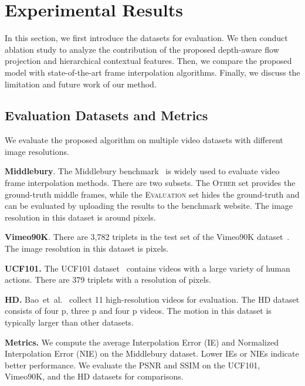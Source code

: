 \documentclass[10pt,twocolumn,letterpaper]{article}
\newcommand{\Paragraph}[1]{{\vspace{-2mm}\flushleft\textbf{#1}}} \newcommand{\ul}[1]{\underline{\smash{#1}}}
\def\etal{et~al.\xspace}
\begin{document}
	
	\section{Experimental Results}
In this section, we first introduce the datasets for evaluation.
We then conduct ablation study to analyze the contribution of the proposed depth-aware flow projection and hierarchical contextual features.
Then, we compare the proposed model with state-of-the-art frame interpolation algorithms.
Finally, we discuss the limitation and future work of our method.
	
	
	
	\subsection{Evaluation Datasets and Metrics}
We evaluate the proposed algorithm on multiple video datasets with different image resolutions.
	
	\Paragraph{Middlebury}. The Middlebury benchmark~\cite{baker2011database} is widely used to evaluate video frame interpolation methods.
There are two subsets.
The \textsc{Other} set provides the ground-truth middle frames, while the \textsc{Evaluation} set hides the ground-truth and can be evaluated by uploading the results to the benchmark website.
The image resolution in this dataset is around  pixels.
	
	
	\Paragraph{Vimeo90K}.
There are 3,782 triplets in the test set of the Vimeo90K dataset~\cite{xue2017video}.
The image resolution in this dataset is  pixels.
	
	
	\Paragraph{UCF101.}
The UCF101 dataset~\cite{soomro2012ucf101} contains videos with a large variety of human actions. 
There are 379 triplets with a resolution of  pixels.


	\Paragraph{HD.} 
Bao~\etal~\cite{bao2018MEMC-Net} collect 11 high-resolution videos for evaluation.
The HD dataset consists of four p, three p and four p videos.
The motion in this dataset is typically larger than other datasets.
	
	
	\Paragraph{Metrics.}
We compute the average Interpolation Error (IE) and Normalized Interpolation Error (NIE) on the Middlebury dataset.
Lower {IE}s or {NIE}s indicate better performance.
We evaluate the PSNR and SSIM on the UCF101, Vimeo90K, and the HD datasets for comparisons.
	
	
	
\end{document}
